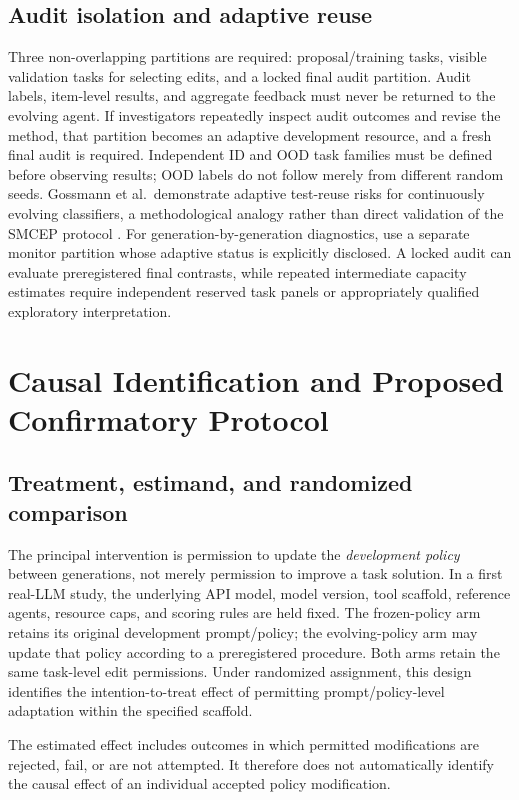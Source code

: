 \documentclass[11pt,a4paper]{article}
\begin{document}
\subsection{Audit isolation and adaptive reuse}
Three non-overlapping partitions are required: proposal/training tasks, visible validation tasks for selecting edits, and a locked final audit partition. Audit labels, item-level results, and aggregate feedback must never be returned to the evolving agent. If investigators repeatedly inspect audit outcomes and revise the method, that partition becomes an adaptive development resource, and a fresh final audit is required. Independent ID and OOD task families must be defined before observing results; OOD labels do not follow merely from different random seeds. Gossmann et al.\ demonstrate adaptive test-reuse risks for continuously evolving classifiers, a methodological analogy rather than direct validation of the SMCEP protocol \cite{gossmann2021}. For generation-by-generation diagnostics, use a separate monitor partition whose adaptive status is explicitly disclosed. A locked audit can evaluate preregistered final contrasts, while repeated intermediate capacity estimates require independent reserved task panels or appropriately qualified exploratory interpretation.

\section{Causal Identification and Proposed Confirmatory Protocol}
\subsection{Treatment, estimand, and randomized comparison}
The principal intervention is permission to update the \emph{development policy} between generations, not merely permission to improve a task solution. In a first real-LLM study, the underlying API model, model version, tool scaffold, reference agents, resource caps, and scoring rules are held fixed. The frozen-policy arm retains its original development prompt/policy; the evolving-policy arm may update that policy according to a preregistered procedure. Both arms retain the same task-level edit permissions. Under randomized assignment, this design identifies the intention-to-treat effect
of permitting prompt/policy-level adaptation within the specified scaffold.

The estimated effect includes outcomes in which permitted modifications are rejected, fail, or are not attempted. It therefore does not automatically identify the causal effect of an individual accepted policy modification.
\end{document}
